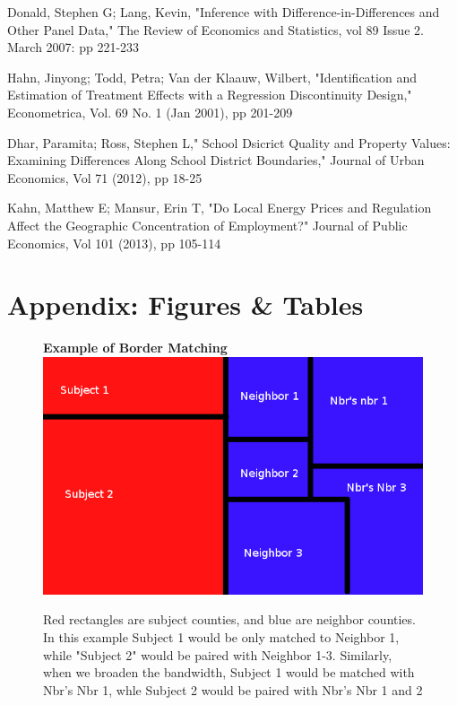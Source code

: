 \documentclass[12pt,a4paper]{article}
\begin{document}
\begin{thebibliography}{99}
Donald, Stephen G; Lang, Kevin, "Inference with Difference-in-Differences and Other Panel Data," The Review of Economics and Statistics, vol 89 Issue 2. March 2007: pp 221-233

Hahn, Jinyong; Todd, Petra; Van der Klaauw, Wilbert, "Identification and Estimation of Treatment Effects with a Regression Discontinuity Design," Econometrica, Vol. 69 No. 1 (Jan 2001), pp 201-209

Dhar, Paramita; Ross, Stephen L," School Dsicrict Quality and Property Values: Examining Differences Along School District Boundaries," Journal of Urban Economics, Vol 71 (2012), pp 18-25

Kahn, Matthew E; Mansur, Erin T, "Do Local Energy Prices and Regulation Affect the Geographic Concentration of Employment?" Journal of Public Economics, Vol 101 (2013), pp 105-114

\end{thebibliography}


\section{Appendix: Figures \& Tables}

\begin{figure}[h]\label{rb}
    \centering
    \textbf{Example of Border Matching}
    \includegraphics[scale = 0.5]{../analysis/output/borders_temp}
    \caption{Red rectangles are subject counties, and blue are neighbor counties. In this example Subject 1 would be only matched to Neighbor 1, while "Subject 2" would be paired with Neighbor 1-3. Similarly, when we broaden the bandwidth, Subject 1 would be matched with Nbr's Nbr 1, whle Subject 2 would be paired with Nbr's Nbr 1 and 2}
\end{figure}
\end{document}
